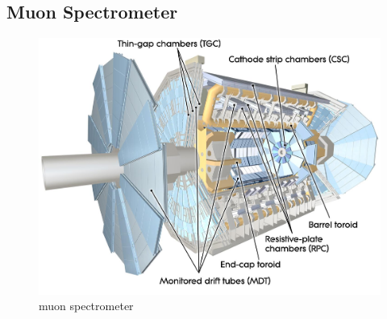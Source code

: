 \subsection{Muon Spectrometer}
\begin{figure}
\centering
\includegraphics[width=\textwidth]{data/photo/detector/muon_spectrometer.jpg}
\caption{muon spectrometer \cite{muon_spectrometer}}
\label{fig:muon_spectrometer}
\end{figure}
